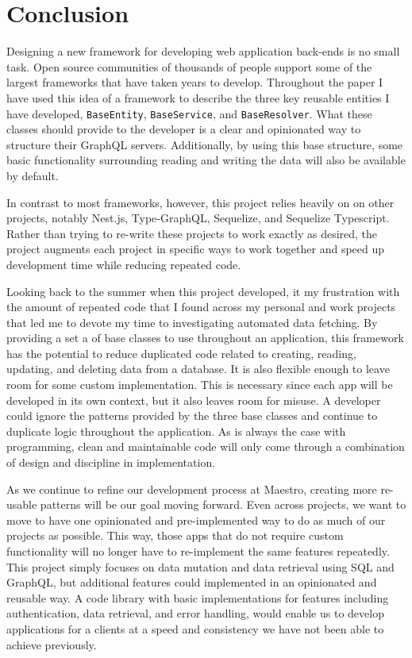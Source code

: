 \section{Conclusion}

Designing a new framework for developing web application back-ends is no small task.  Open source communities of thousands of people support some of the largest frameworks that have taken years to develop. Throughout the paper I have used this idea of a framework to describe the three key reusable entities I have developed, \verb!BaseEntity!, \verb!BaseService!, and \verb!BaseResolver!.  What these classes should provide to the developer is a clear and opinionated way to structure their GraphQL servers.  Additionally, by using this base structure, some basic functionality surrounding reading and writing the data will also be available by default.

In contrast to most frameworks, however, this project relies heavily on on other projects, notably Nest.js, Type-GraphQL, Sequelize, and Sequelize Typescript.  Rather than trying to re-write these projects to work exactly as desired, the project augments each project in specific ways to work together and speed up development time while reducing repeated code.

Looking back to the summer when this project developed, it my frustration with the amount of repeated code that I found across my personal and work projects that led me to devote my time to investigating automated data fetching.  By providing a set a of base classes to use throughout an application, this framework has the potential to reduce duplicated code related to creating, reading, updating, and deleting data from a database.  It is also flexible enough to leave room for some custom implementation.  This is necessary since each app will be developed in its own context, but it also leaves room for misuse.  A developer could ignore the patterns provided by the three base classes and continue to duplicate logic throughout the application.  As is always the case with programming, clean and maintainable code will only come through a combination of design and discipline in implementation.

As we continue to refine our development process at Maestro, creating more re-usable patterns will be our goal moving forward.  Even across projects, we want to move to have one opinionated and pre-implemented way to do as much of our projects as possible.  This way, those apps that do not require custom functionality will no longer have to re-implement the same features repeatedly.  This project simply focuses on data mutation and data retrieval using SQL and GraphQL, but additional features could implemented in an opinionated and reusable way.  A code library with basic implementations for features including authentication, data retrieval, and error handling, would enable us to develop applications for a clients at a speed and consistency we have not been able to achieve previously.